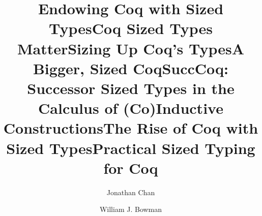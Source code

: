 \title{Endowing Coq with Sized Types}
\title{Coq Sized Types Matter}
\title{Sizing Up Coq's Types}
\title{A Bigger, Sized Coq}
\title{SuccCoq: Successor Sized Types in the Calculus of (Co)Inductive Constructions}
\title{The Rise of Coq with Sized Types}
\title{Practical Sized Typing for Coq}

\author{Jonathan Chan}

\author{William J. Bowman}

\usepackage{amsmath}
\usepackage{amsfonts}
\usepackage{mathtools}
\usepackage{stmaryrd}
\usepackage{minted}
\usepackage{bussproofs}
\usepackage{mathpartir}
\usepackage{cuted}
\usepackage{hyphenat}
\usepackage{stackengine}
\usepackage{xspace}
\usepackage[shortcuts]{extdash}
\usepackage{soul}
\usepackage{enumitem}
\usepackage[title]{appendix}
\usepackage{hyperref}
\usepackage{proof}
\usepackage{doi}
\usepackage[pdf]{graphviz}

\def\sectionautorefname{Section}
\def\subsectionautorefname{Subsection}
\def\subsubsectionautorefname{Subsubsection}
\def\figureautorefname{Figure}
\def\tableautorefname{Table}
\def\Appendixautorefname{Appendix}
\renewcommand{\RightTirNameStyle}{\upshape}


